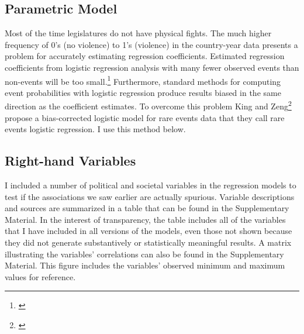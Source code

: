 \documentclass[a4paper]{article}\usepackage[]{graphicx}\usepackage[]{color}
\begin{document}
\subsection{Parametric Model}

Most of the time legislatures do not have physical fights. The much higher frequency of 0's (no violence) to 1's (violence) in the country-year data presents a problem for accurately estimating regression coefficients. Estimated regression coefficients from logistic regression analysis with many fewer observed events than non-events will be too small.\footnote{\citealt[137]{KingRareEventsPA2001}} Furthermore, standard methods for computing event probabilities with logistic regression produce results biased in the same direction as the coefficient estimates. To overcome this problem King and Zeng\footnote{\citealt{KingRareEvents2001,KingRareEventsPA2001}} propose a bias-corrected logistic model for rare events data that they call rare events logistic regression. I use this method below.

\subsection{Right-hand Variables}

I included a number of political and societal variables in the regression models to test if the associations we saw earlier are actually spurious. Variable descriptions and sources are summarized in a table that can be found in the Supplementary Material. In the interest of transparency, the table includes all of the variables that I have included in all versions of the models, even those not shown because they did not generate substantively or statistically meaningful results. A matrix illustrating the variables' correlations can also be found in the Supplementary Material. This figure includes the variables' observed minimum and maximum values for reference. 
\end{document}
